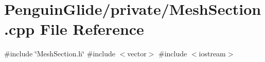 \section{Penguin\+Glide/private/\+Mesh\+Section.cpp File Reference}
\label{_mesh_section_8cpp}
{\ttfamily \#include \char`\"{}Mesh\+Section.\+h\char`\"{}}\newline
{\ttfamily \#include $<$vector$>$}\newline
{\ttfamily \#include $<$iostream$>$}\newline
